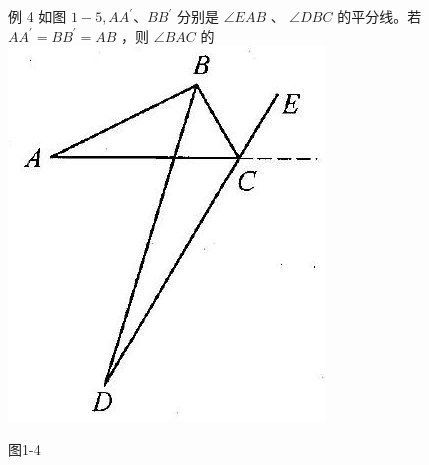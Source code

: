 \documentclass[10pt]{article}
\begin{document}
例 4 如图 $1-5, A A^{\prime} 、 B B^{\prime}$ 分别是 $\angle E A B$ 、 $\angle D B C$ 的平分线。若 $A A^{\prime}=B B^{\prime}=A B$ ，则 $\angle B A C$ 的\\
\includegraphics[max width=\textwidth, center]{2024_10_30_2c8f45efd4a519b08e1ag-010(3)}

图1-4
\end{document}
